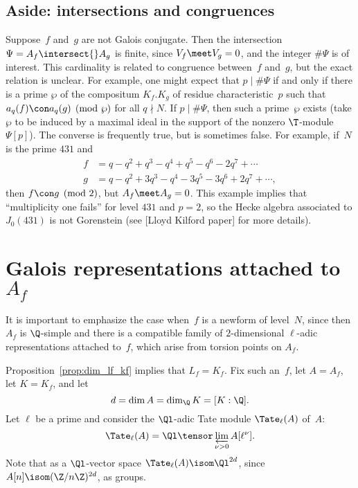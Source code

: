 \documentclass{report}
\begin{document}
\subsection{Aside: intersections and congruences}\label{sec:int_cong}
Suppose~$f$ and~$g$ are not Galois conjugate.  Then the
intersection $\Psi=A_f\intersect{}A_g$ is finite, since $V_f\meet
V_g = 0$, and the integer $\#\Psi$ is of interest.  This
cardinality is related to congruence between~$f$ and~$g$, but the
exact relation is unclear.   For example, one might expect that
$p\mid \#\Psi$ if and only if there is a prime $\wp$ of the
compositum  $K_f.K_g$ of residue characteristic~$p$ such that
$a_q(f) \con a_q(g)\pmod{\wp}$ for all $q\nmid N$.   If $p\mid
\#\Psi$, then such a prime~$\wp$ exists (take $\wp$ to be induced
by a maximal ideal in the support of the nonzero $\T$-module
$\Psi[p]$). The converse is frequently true, but is sometimes
false. For example, if~$N$ is the prime $431$ and
\begin{align*}
f&=q - q^2 + q^3 - q^4 + q^5 - q^6 - 2q^7 + \cdots\\
g&=q - q^2 + 3q^3 - q^4 - 3q^5 - 3q^6 + 2q^7 + \cdots,
\end{align*}
then $f\con g\pmod{2}$, but $A_f\meet A_g = 0$.
This example implies that ``multiplicity one fails'' for level $431$
and $p=2$, so the Hecke algebra associated to $J_0(431)$ is not
Gorenstein (see
[Lloyd Kilford paper] for more details).


\section{Galois representations attached to $A_f$}
It is important to emphasize the case when~$f$ is a newform of
level~$N$, since then $A_f$ is $\Q$-simple and there is a compatible family of
$2$-dimensional $\ell$-adic representations attached to~$f$, which
arise from torsion points on $A_f$.

Proposition~\ref{prop:dim_lf_kf} implies
that $L_f=K_f$. Fix such an~$f$, let $A=A_f$, let $K=K_f$, and let
\[
  d=\dim A=\dim_{\Q} K=[K:\Q].
\]
Let $\ell$ be a prime and consider the $\Ql$-adic Tate module
$\Tate_{\ell}(A)$  of~$A$:
\[
\Tate_{\ell}(A)=\Ql\tensor \varprojlim_{\nu>0} A[\ell^{\nu}].
\]
Note that as a $\Ql$-vector space $\Tate_{\ell}(A)\isom\Ql^{2d}$,
since $A[n]\isom (\Z/n\Z)^{2d}$, as groups.
\end{document}
